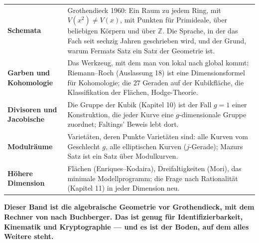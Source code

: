 \begin{merksatz}
\begin{center}
{\small
\renewcommand{\arraystretch}{1.5}
\begin{tabular}{@{}P{3.0cm}P{5.6cm}@{}}
\toprule
\textbf{Schemata} & Grothendieck 1960: Ein Raum zu jedem Ring, mit $V(x^{2})\ne V(x)$, mit Punkten für Primideale, über beliebigen Körpern und über $\mathbb Z$. Die Sprache, in der das Fach seit sechzig Jahren geschrieben wird, und der Grund, warum Fermats Satz ein Satz der Geometrie ist.\\
\textbf{Garben und Kohomologie} & Das Werkzeug, mit dem man von lokal nach global kommt: Riemann--Roch (Auslassung 18) ist eine Dimensionsformel für Kohomologie; die $27$ Geraden auf der Kubikfläche, die Klassifikation der Flächen, Hodge-Theorie.\\
\textbf{Divisoren und Jacobische} & Die Gruppe der Kubik (Kapitel 10) ist der Fall $g = 1$ einer Konstruktion, die jeder Kurve eine $g$-dimensionale Gruppe zuordnet; Faltings' Beweis lebt dort.\\
\textbf{Modulräume} & Varietäten, deren Punkte Varietäten sind: alle Kurven vom Geschlecht $g$, alle elliptischen Kurven ($j$-Gerade); Mazurs Satz ist ein Satz über Modulkurven.\\
\textbf{Höhere Dimension} & Flächen (Enriques--Kodaira), Dreifaltigkeiten (Mori), das minimale Modellprogramm; die Frage nach Rationalität (Kapitel 11) in jeder Dimension neu.\\
\bottomrule
\end{tabular}}
\end{center}

\begin{center}
\begin{minipage}{0.9\textwidth}
\textbf{Dieser Band ist die algebraische Geometrie vor Grothendieck, mit dem Rechner von nach Buchberger. Das ist genug für Identifizierbarkeit, Kinematik und Kryptographie --- und es ist der Boden, auf dem alles Weitere steht.}
\end{minipage}
\end{center}

\begin{center}
\begin{minipage}{0.88\textwidth}
\end{minipage}
\end{center}
\end{merksatz}

